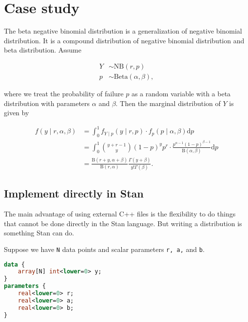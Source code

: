 \documentclass[11pt]{article}
\begin{document}
\section{Case study}

The beta negative binomial distribution is a generalization of negative binomial distribution. It is a compound distribution of negative binomial distribution and beta distribution. Assume

\begin{equation*}
  \begin{aligned}
  Y &\sim \text{NB}(r,p) \\
  p &\sim {\textrm {Beta}}(\alpha ,\beta ),
  \end{aligned}
\end{equation*}

where we treat the probability of failure $p$ as a random variable with a beta distribution with parameters $\alpha$ and $\beta$. Then the marginal distribution of $Y$ is given by

\begin{equation}
  \begin{aligned}
  f(y \mid r, \alpha ,\beta) &=\int_{0}^{1} f_{Y \mid p}(y \mid r,p) \cdot f_{p}(p \mid \alpha ,\beta )\mathrm {d} p \\ 
  &=\int_{0}^{1} {\binom {y+r-1}{y}} (1-p)^{y} p^{r} \cdot {\frac {p^{\alpha -1}(1-p)^{\beta -1}}{\mathrm{B} (\alpha ,\beta )}} \mathrm{d}p \\
  &= {\frac {\mathrm{B} (r+y,\alpha +\beta )}{\mathrm{B} (r,\alpha )}}{\frac {\Gamma (y+\beta )}{y! \Gamma (\beta )}}.
  \end{aligned}
\end{equation}





\subsection{Implement directly in Stan}

The main advantage of using external C++ files is the flexibility to do things that cannot be done directly in the Stan language. But writing a distribution is something Stan can do.

Suppose we have \verb|N| data points and scalar parameters \verb|r, a,| and \verb|b|.
\begin{lstlisting}[language=Stan, style=lgeneral]
data {
	array[N] int<lower=0> y;
}
parameters {
	real<lower=0> r;
	real<lower=0> a;
	real<lower=0> b;
}
\end{lstlisting}
\end{document}
